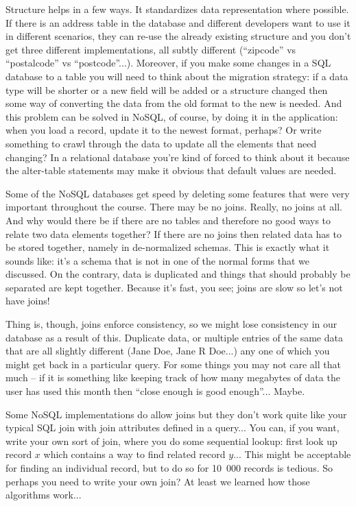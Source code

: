 Structure helps in a few ways. It standardizes data representation where possible. If there is an address table in the database and different developers want to use it in different scenarios, they can re-use the already existing structure and you don't get three different implementations, all subtly different (``zipcode'' vs ``postalcode'' vs ``postcode''...). Moreover, if you make some changes in a SQL database to a table you will need to think about the migration strategy: if a data type will be shorter or  a new field will be added or a structure changed then some way of converting the data from the old format to the new is needed. And this problem can be solved in NoSQL, of course, by doing it in the application: when you load a record, update it to the newest format, perhaps? Or write something to crawl through the data to update all the elements that need changing? In a relational database you're kind of forced to think about it because the alter-table statements may make it obvious that default values are needed. 

Some of the NoSQL databases get speed by deleting some features that were very important throughout the course. There may be no joins. Really, no joins at all. And why would there be if there are no tables and therefore no good ways to relate two data elements together? If there are no joins then related data has to be stored together, namely in de-normalized schemas. This is exactly what it sounds like: it's a schema that is not in one of the normal forms that we discussed. On the contrary, data is duplicated and things that should probably be separated are kept together. Because it's fast, you see; joins are slow so let's not have joins!

Thing is, though, joins enforce consistency, so we might lose consistency in our database as a result of this. Duplicate data, or multiple entries of the same data that are all slightly different (Jane Doe, Jane R Doe...) any one of which you might get back in a particular query. For some things you may not care all that much -- if it is something like keeping track of how many megabytes of data the user has used this month then ``close enough is good enough''... Maybe.

Some NoSQL implementations do allow joins but they don't work quite like your typical SQL join with join attributes defined in a query... You can, if you want, write your own sort of join, where you do some sequential lookup: first look up record $x$ which contains a way to find related record $y$... This might be acceptable for finding an individual record, but to do so for 10~000 records is tedious. So perhaps you need to write your own join? At least we learned how those algorithms work... 

